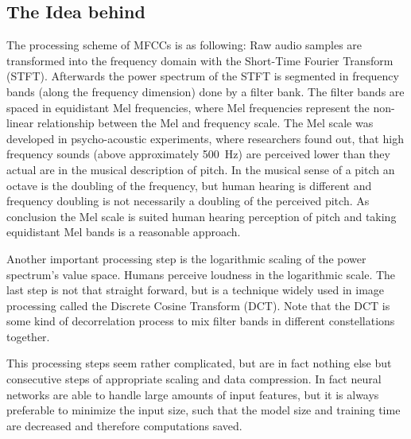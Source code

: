 
\subsection{The Idea behind}
The processing scheme of MFCCs is as following:
Raw audio samples are transformed into the frequency domain with the Short-Time Fourier Transform (STFT).
Afterwards the power spectrum of the STFT is segmented in frequency bands (along the frequency dimension) done by a filter bank.
The filter bands are spaced in equidistant Mel frequencies, where Mel frequencies represent the non-linear relationship between the Mel and frequency scale.
The Mel scale was developed in psycho-acoustic experiments, where researchers found out, that high frequency sounds (above approximately \SI{500}{\hertz}) are perceived lower than they actual are in the musical description of pitch.
In the musical sense of a pitch an octave is the doubling of the frequency, but human hearing is different and frequency doubling is not necessarily a doubling of the perceived pitch.
As conclusion the Mel scale is suited human hearing perception of pitch and taking equidistant Mel bands is a reasonable approach.

Another important processing step is the logarithmic scaling of the power spectrum's value space.
Humans perceive loudness in the logarithmic scale.
The last step is not that straight forward, but is a technique widely used in image processing called the Discrete Cosine Transform (DCT).
Note that the DCT is some kind of decorrelation process to mix filter bands in different constellations together.

This processing steps seem rather complicated, but are in fact nothing else but consecutive steps of appropriate scaling and data compression.
In fact neural networks are able to handle large amounts of input features, but it is always preferable to minimize the input size, such that the model size and training time are decreased and therefore computations saved.



